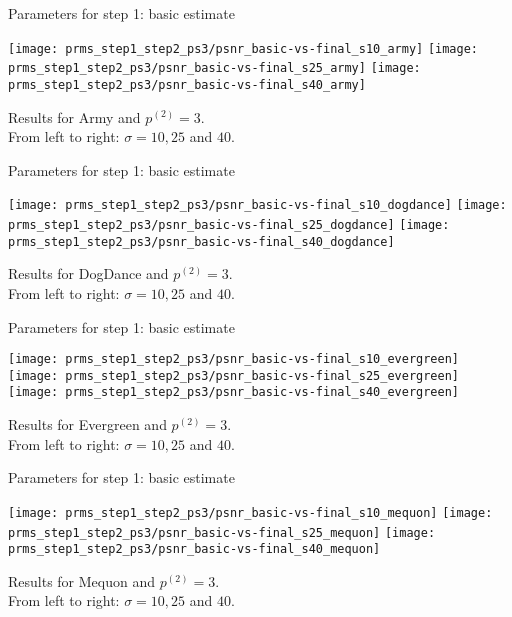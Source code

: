 \documentclass[mathserif, 8pt]{beamer}
\makeatletter
\newcounter{multipleslide}
\newcommand{\multipleframe}{%
\setcounter{multipleslide}{\value{framenumber}}
\stepcounter{multipleslide}
\patchcmd{\beamer@@tmpl@footline}%
	{\insertframenumber}%
	{\themultipleslide}%
	{}%
	{}%
}
\makeatother
\begin{document}
\multipleframe
\begin{frame}{Parameters for step 1: basic estimate}
	\begin{center}
		\texttt{[image: prms\_step1\_step2\_ps3/psnr\_basic-vs-final\_s10\_army]}%
		\texttt{[image: prms\_step1\_step2\_ps3/psnr\_basic-vs-final\_s25\_army]}%
		\texttt{[image: prms\_step1\_step2\_ps3/psnr\_basic-vs-final\_s40\_army]}

		\bigskip

		Results for Army and $p^{(2)} = 3$.\\From left to right: $\sigma = 10, 25$ and $40$.
	\end{center}
\end{frame}
\begin{frame}{Parameters for step 1: basic estimate}
	\begin{center}
		\texttt{[image: prms\_step1\_step2\_ps3/psnr\_basic-vs-final\_s10\_dogdance]}%
		\texttt{[image: prms\_step1\_step2\_ps3/psnr\_basic-vs-final\_s25\_dogdance]}%
		\texttt{[image: prms\_step1\_step2\_ps3/psnr\_basic-vs-final\_s40\_dogdance]}

		\bigskip

		Results for DogDance and $p^{(2)} = 3$.\\From left to right: $\sigma = 10, 25$ and $40$.
	\end{center}
\end{frame}
\begin{frame}{Parameters for step 1: basic estimate}
	\begin{center}
		\texttt{[image: prms\_step1\_step2\_ps3/psnr\_basic-vs-final\_s10\_evergreen]}%
		\texttt{[image: prms\_step1\_step2\_ps3/psnr\_basic-vs-final\_s25\_evergreen]}%
		\texttt{[image: prms\_step1\_step2\_ps3/psnr\_basic-vs-final\_s40\_evergreen]}

		\bigskip

		Results for Evergreen and $p^{(2)} = 3$.\\From left to right: $\sigma = 10, 25$ and $40$.
	\end{center}
\end{frame}
\begin{frame}{Parameters for step 1: basic estimate}
	\begin{center}
		\texttt{[image: prms\_step1\_step2\_ps3/psnr\_basic-vs-final\_s10\_mequon]}%
		\texttt{[image: prms\_step1\_step2\_ps3/psnr\_basic-vs-final\_s25\_mequon]}%
		\texttt{[image: prms\_step1\_step2\_ps3/psnr\_basic-vs-final\_s40\_mequon]}

		\bigskip

		Results for Mequon and $p^{(2)} = 3$.\\From left to right: $\sigma = 10, 25$ and $40$.
	\end{center}
\end{frame}
\end{document}

